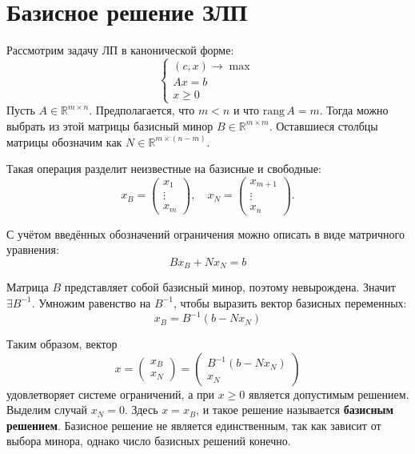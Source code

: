 \documentclass[17pt]{extarticle}
\begin{document}
\section{Базисное решение ЗЛП}

Рассмотрим задачу ЛП в канонической форме:
\[
    \begin{cases}
        (c, x) \to \max \\
        A x = b         \\
        x \ge 0
    \end{cases}
\]
Пусть \( A \in \mathbb{R}^{m \times n} \). Предполагается, что \( m < n \) и что \( \text{rang}\, A = m \). Тогда можно выбрать из этой матрицы базисный минор \( B \in \mathbb{R}^{m \times m} \). Оставшиеся столбцы матрицы обозначим как \( N \in \mathbb{R}^{m \times (n - m)} \).

Такая операция разделит неизвестные на базисные и свободные:
\[
    x_B = \begin{pmatrix} x_1 \\ \vdots \\ x_m \end{pmatrix}, \quad
    x_N = \begin{pmatrix} x_{m+1} \\ \vdots \\ x_n \end{pmatrix}.
\]

С учётом введённых обозначений ограничения можно описать в виде матричного уравнения:
\[
    B x_B + N x_N = b
\]

Матрица \( B \) представляет собой базисный минор, поэтому невырождена. Значит \( \exists B^{-1} \). Умножим равенство на \( B^{-1} \), чтобы выразить вектор базисных переменных:
\[
    x_B = B^{-1}(b - N x_N)
\]

Таким образом, вектор
\[
    x = \begin{pmatrix}
        x_B \\ x_N
    \end{pmatrix}
    = \begin{pmatrix}
        B^{-1}(b - N x_N) \\ x_N
    \end{pmatrix}
\]
удовлетворяет системе ограничений, а при \( x \ge 0 \) является допустимым решением. Выделим случай \( x_N = 0 \). Здесь \( x = x_B \), и такое решение называется \textbf{базисным решением}. Базисное решение не является единственным, так как зависит от выбора минора, однако число базисных решений конечно.
\end{document}
